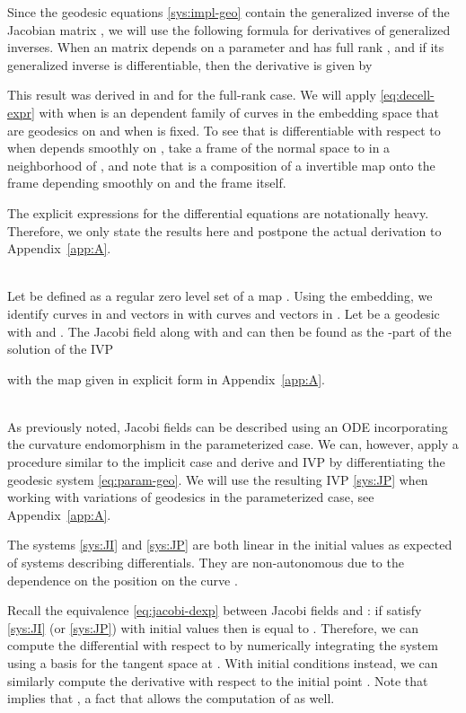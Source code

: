 \documentclass[final]{svjour3}
\begin{document}
Since the geodesic equations \eqref{sys:impl-geo} contain the
generalized inverse of the Jacobian matrix , we will use the following
formula for derivatives of generalized inverses. When an  matrix  depends
on a parameter  and has full rank , and if
its generalized inverse  is differentiable,
then the derivative  is given by 

This result was derived in \cite{decell_derivative_1974,golub_differentiation_1973}
and \cite{hanson_extensions_1969} for the full-rank case.
We will apply \eqref{eq:decell-expr} with  when  is an  dependent
family of curves in the embedding space  that are geodesics on  and
when  is fixed. To see 
that  is
differentiable with respect to  when  depends smoothly on , take a 
frame of the normal space to  in a neighborhood of , and note that 
 is a composition of a invertible map onto the frame 
depending smoothly on  and the frame itself. 

The explicit expressions for the differential equations are notationally
heavy. Therefore, we only
state the results here and postpone the actual derivation 
to Appendix~\ref{app:A}.
\begin{em}
  \vspace{0.5em}
  \\
    Let  be defined as a regular zero
    level set of a  map . Using the embedding, we
    identify curves in  and vectors in  with curves and vectors in
    . Let  be a geodesic with  and .
    The Jacobi field  along  with  and
     can then be found as the -part of the solution of the IVP
    
    with  the map given in explicit form in Appendix~\ref{app:A}.
\end{em}\vspace{0.5em}\\
As previously noted, Jacobi fields can be described using an ODE incorporating
the curvature endomorphism in the parameterized case. We can, however, apply a
procedure similar to the implicit case and derive and IVP by differentiating
the geodesic system \eqref{eq:param-geo}. We will use the resulting IVP
\eqref{sys:JP} when working
with variations of geodesics in the parameterized case, see
Appendix~\ref{app:A}.

The systems \eqref{sys:JI} and \eqref{sys:JP} are both linear in the initial values  
as expected of systems describing differentials. They are non-autonomous due to the
dependence on the position on the curve .

Recall the equivalence \eqref{eq:jacobi-dexp} between Jacobi fields 
and : if  satisfy \eqref{sys:JI}
    (or \eqref{sys:JP}) with initial values  then  is
    equal to .
Therefore, we can compute the differential  with respect to  by
numerically integrating the system using a
basis  for the tangent space  at . With
initial conditions  instead, we can similarly compute the derivative
with respect to the initial point . Note 
that 
implies that , a fact that allows the
computation of  as well.
\end{document}
